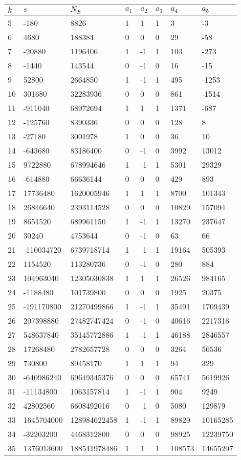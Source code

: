 \documentclass{amsart}
\begin{document}
\begin{longtable}{|l|l|l|lllll|}
\hline
$k$ & $s$ & $N_E$ & $a_1$ & $a_2$ & $a_3$ & $a_4$ & $a_5$\\
\hline
5&-180&8826&1&1&1&3&-3\\
6&4680&188384&0&0&0&29&-58\\
7&-20880&1196406&1&-1&1&103&-273\\
8&-1440&143544&0&-1&0&16&-15\\
9&52800&2664850&1&-1&1&495&-1253\\
10&301680&32283936&0&0&0&861&-1514\\
11&-911040&68972694&1&1&1&1371&-687\\
12&-125760&8390336&0&0&0&128&8\\
13&-27180&3001978&1&0&0&36&10\\
14&-643680&83186400&0&-1&0&3992&13012\\
15&9722880&678994646&1&-1&1&5301&29329\\
16&-614880&66636144&0&0&0&429&893\\
17&17736480&1620005946&1&1&1&8700&101343\\
18&26846640&2393114528&0&0&0&10829&157094\\
19&8651520&689961150&1&-1&1&13270&237647\\
20&30240&4753644&0&-1&0&63&66\\
21&-110034720&6739718714&1&-1&1&19164&505393\\
22&1154520&113280736&0&-1&0&280&884\\
23&104963040&12305030838&1&1&1&26526&984165\\
24&-1188480&101739800&0&0&0&1925&20375\\
25&-191170800&21270499866&1&-1&1&35491&1709439\\
26&207398880&27482747424&0&-1&0&40616&2217316\\
27&548637840&35145772886&1&-1&1&46188&2846557\\
28&17268480&2782657728&0&0&0&3264&56536\\
29&730800&89458170&1&1&1&94&329\\
30&-640986240&69649345376&0&0&0&65741&5619926\\
31&-11134800&1063157814&1&-1&1&904&9249\\
32&42802560&6608492016&0&-1&0&5080&129879\\
33&1645704000&128984622458&1&-1&1&89829&10165285\\
34&-32203200&4468312800&0&0&0&98925&12239750\\
35&1376013600&188541978486&1&1&1&108573&14655207\\

\end{longtable}
\end{document}
